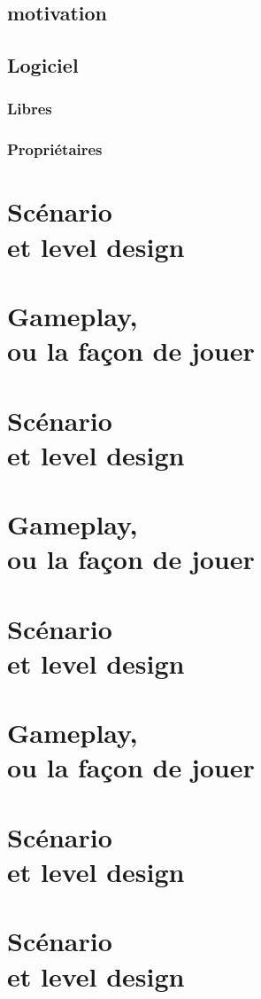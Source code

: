 \documentclass[a4paper, 10pt, oneside, fleqn]{report}
\begin{document}
	\section{motivation}
	\section{Logiciel}
	\subsection{Libres}
	\subsection{Propriétaires}
	
	\chapter[Scénarioet level design]{Scénario\\et level design}	
	
	\chapter[Gameplay, ou la façon de jouer]{Gameplay,\\ou la façon de jouer}
	
	\chapter[Scénario et level design]{Scénario\\et level design}
	
	\chapter[Gameplay, ou la façon de jouer]{Gameplay,\\ou la façon de jouer}
	
	\chapter[Scénario et level design]{Scénario\\et level design}
	
	\chapter[Gameplay, ou la façon de jouer]{Gameplay,\\ou la façon de jouer}
	
	\chapter[Scénario et level design]{Scénario\\et level design} 
	
	\chapter[Scénario et level design]{Scénario\\et level design} 
	
\end{document}
